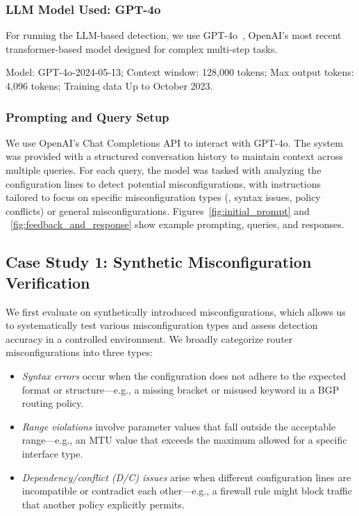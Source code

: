 \subsubsection{LLM Model Used: GPT-4o} For running the LLM-based detection, we use GPT-4o~\cite{openai_gpt4o}, OpenAI's most recent transformer-based model designed for complex multi-step tasks.

 Model: GPT-4o-2024-05-13; Context window: 128,000 tokens; Max output tokens: 4,096 tokens; Training data Up to October 2023.

\subsubsection{Prompting and Query Setup}
We use OpenAI’s Chat Completions API to interact with GPT-4o. The system was provided with a structured conversation history to maintain context across multiple queries. For each query, the model was tasked with analyzing the configuration lines to detect potential misconfigurations, with instructions tailored to focus on specific misconfiguration types (\eg, syntax issues, policy conflicts) or general misconfigurations. Figures~\ref{fig:initial_prompt} and ~\ref{fig:feedback_and_response}
show example prompting, queries, and responses.

\subsection{Case Study 1: Synthetic Misconfiguration Verification}
We first evaluate \sysname{} on synthetically introduced misconfigurations, which allows us to systematically test various misconfiguration types and assess detection accuracy in a controlled environment.
We broadly categorize router misconfigurations into three types:
\begin{itemize}
    \item \textit{Syntax errors} occur when the configuration does not adhere to the expected format or structure---e.g., a missing bracket or misused keyword in a BGP routing policy.
    \item \textit{Range violations} involve parameter values that fall outside the acceptable range---e.g., an MTU value that exceeds the maximum allowed for a specific interface type.
    \item \textit{Dependency/conflict (D/C) issues} arise when different configuration lines are incompatible or contradict each other---e.g., a firewall rule might block traffic that another policy explicitly permits.
\end{itemize}


